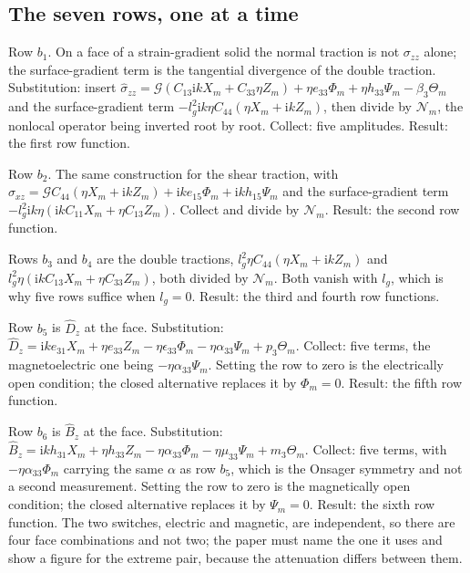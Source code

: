\documentclass[11pt]{article}
\makeatletter
\newif\ifshowworked
\newenvironment{worked}{%
  \ifshowworked\par\smallskip\noindent\textit{Working.}\par\smallskip\else
  \setbox\z@\vbox\bgroup\fi}{\ifshowworked\par\smallskip\else\egroup\fi}
\newcommand{\ii}{\mathrm{i}}
\newcommand{\Ncal}{\mathcal{N}}
\newcommand{\Gcal}{\mathcal{G}}
\makeatother
\begin{document}
\subsection*{The seven rows, one at a time}

\begin{worked}
Row $b_1$. On a face of a strain-gradient solid the normal traction is not $\sigma_{zz}$ alone; the
surface-gradient term is the tangential divergence of the double traction. Substitution: insert
$\hat\sigma_{zz}=\Gcal(C_{13}\ii kX_m+C_{33}\eta Z_m)+\eta e_{33}\Phi_m+\eta h_{33}\Psi_m-\beta_3\Theta_m$
and the surface-gradient term $-l_g^2\ii k\eta C_{44}(\eta X_m+\ii kZ_m)$, then divide by $\Ncal_m$, the
nonlocal operator being inverted root by root. Collect: five amplitudes. Result: the first row function.
\end{worked}

\begin{worked}
Row $b_2$. The same construction for the shear traction, with
$\hat\sigma_{xz}=\Gcal C_{44}(\eta X_m+\ii kZ_m)+\ii ke_{15}\Phi_m+\ii kh_{15}\Psi_m$ and the
surface-gradient term $-l_g^2\ii k\eta(\ii kC_{11}X_m+\eta C_{13}Z_m)$. Collect and divide by $\Ncal_m$.
Result: the second row function.
\end{worked}

\begin{worked}
Rows $b_3$ and $b_4$ are the double tractions, $l_g^2\eta C_{44}(\eta X_m+\ii kZ_m)$ and
$l_g^2\eta(\ii kC_{13}X_m+\eta C_{33}Z_m)$, both divided by $\Ncal_m$. Both vanish with $l_g$, which is
why five rows suffice when $l_g=0$. Result: the third and fourth row functions.
\end{worked}

\begin{worked}
Row $b_5$ is $\hat D_z$ at the face. Substitution:
$\hat D_z=\ii ke_{31}X_m+\eta e_{33}Z_m-\eta\epsilon_{33}\Phi_m-\eta\alpha_{33}\Psi_m+p_3\Theta_m$.
Collect: five terms, the magnetoelectric one being $-\eta\alpha_{33}\Psi_m$. Setting the row to zero is
the electrically open condition; the closed alternative replaces it by $\Phi_m=0$. Result: the fifth row
function.
\end{worked}

\begin{worked}
Row $b_6$ is $\hat B_z$ at the face. Substitution:
$\hat B_z=\ii kh_{31}X_m+\eta h_{33}Z_m-\eta\alpha_{33}\Phi_m-\eta\mu_{33}\Psi_m+m_3\Theta_m$. Collect:
five terms, with $-\eta\alpha_{33}\Phi_m$ carrying the same $\alpha$ as row $b_5$, which is the Onsager
symmetry and not a second measurement. Setting the row to zero is the magnetically open condition; the
closed alternative replaces it by $\Psi_m=0$. Result: the sixth row function. The two switches, electric
and magnetic, are independent, so there are four face combinations and not two; the paper must name the
one it uses and show a figure for the extreme pair, because the attenuation differs between them.
\end{worked}
\end{document}

